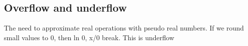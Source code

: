 
\subsection{Overflow and underflow}

The need to approximate real operations with pseudo real numbers. If we round small values to 0, then ln 0, x/0 break. This is underflow

